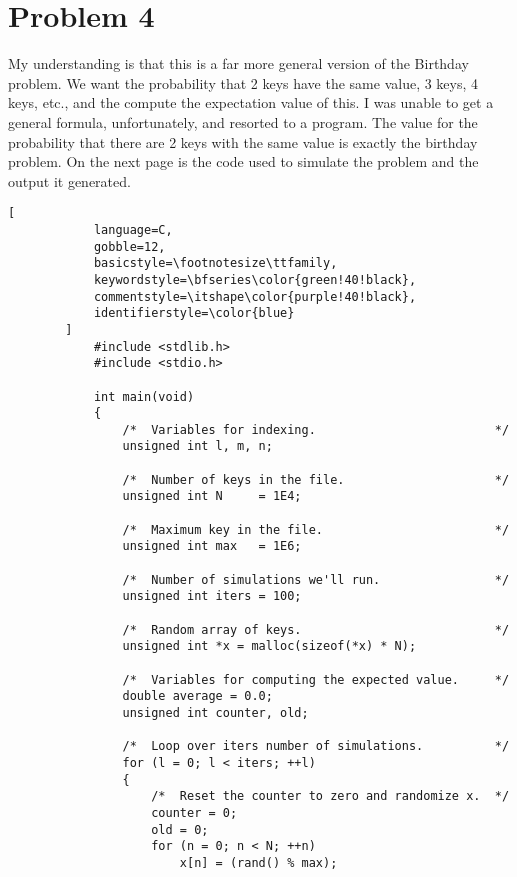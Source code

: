 \documentclass{article}
\begin{document}
    \section*{Problem 4}
        My understanding is that this is a far more general version of the Birthday
        problem. We want the probability that 2 keys have the same value, 3 keys, 4 keys,
        etc., and the compute the expectation value of this. I was unable to get a
        general formula, unfortunately, and resorted to a program. The value for
        the probability that there are 2 keys with the same value is exactly the
        birthday problem. On the next page is the code used to simulate the problem
        and the output it generated.
        \newpage
        \begin{lstlisting}[
            language=C,
            gobble=12,
            basicstyle=\footnotesize\ttfamily,
            keywordstyle=\bfseries\color{green!40!black},
            commentstyle=\itshape\color{purple!40!black},
            identifierstyle=\color{blue}
        ]
            #include <stdlib.h>
            #include <stdio.h>
            
            int main(void)
            {
                /*  Variables for indexing.                         */
                unsigned int l, m, n;
                
                /*  Number of keys in the file.                     */
                unsigned int N     = 1E4;
                
                /*  Maximum key in the file.                        */
                unsigned int max   = 1E6;
                
                /*  Number of simulations we'll run.                */
                unsigned int iters = 100;
                
                /*  Random array of keys.                           */
                unsigned int *x = malloc(sizeof(*x) * N);
                
                /*  Variables for computing the expected value.     */
                double average = 0.0;
                unsigned int counter, old;
            
                /*  Loop over iters number of simulations.          */
                for (l = 0; l < iters; ++l)
                {
                    /*  Reset the counter to zero and randomize x.  */
                    counter = 0;
                    old = 0;
                    for (n = 0; n < N; ++n)
                        x[n] = (rand() % max);
            

\end{lstlisting}
\end{document}
